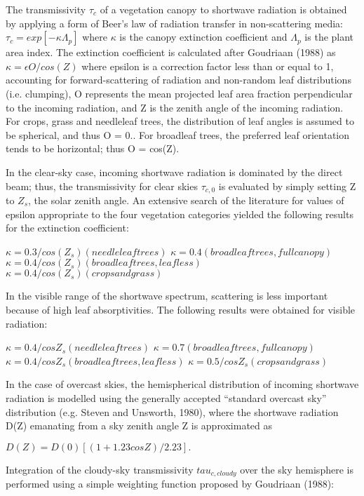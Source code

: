 The transmissivity $\tau_c$ of a vegetation canopy to shortwave radiation is obtained by applying a form of Beer’s law of radiation transfer in non-\/scattering media\+: $\tau_c = exp[-\kappa \Lambda_p]$ where $\kappa$ is the canopy extinction coefficient and $\Lambda_p$ is the plant area index. The extinction coefficient is calculated after Goudriaan (1988) as $\kappa = \epsilon O/cos(Z)$ where epsilon is a correction factor less than or equal to 1, accounting for forward-\/scattering of radiation and non-\/random leaf distributions (i.\+e. clumping), O represents the mean projected leaf area fraction perpendicular to the incoming radiation, and Z is the zenith angle of the incoming radiation. For crops, grass and needleleaf trees, the distribution of leaf angles is assumed to be spherical, and thus O = 0.. For broadleaf trees, the preferred leaf orientation tends to be horizontal; thus O = cos(\+Z).

In the clear-\/sky case, incoming shortwave radiation is dominated by the direct beam; thus, the transmissivity for clear skies $\tau_{c,0}$ is evaluated by simply setting Z to $Z_s$, the solar zenith angle. An extensive search of the literature for values of epsilon appropriate to the four vegetation categories yielded the following results for the extinction coefficient\+:

$\kappa = 0.3/cos(Z_s) (needleleaf trees)$ $\kappa = 0.4 (broadleaf trees, full canopy)$ $\kappa = 0.4/cos(Z_s) (broadleaf trees, leafless)$ $\kappa = 0.4/cos(Z_s) (crops and grass)$

In the visible range of the shortwave spectrum, scattering is less important because of high leaf absorptivities. The following results were obtained for visible radiation\+:

$\kappa = 0.4/cosZ_s (needleleaf trees)$ $\kappa = 0.7 (broadleaf trees, full canopy)$ $\kappa = 0.4/cosZ_s (broadleaf trees, leafless)$ $\kappa = 0.5/cosZ_s (crops and grass)$

In the case of overcast skies, the hemispherical distribution of incoming shortwave radiation is modelled using the generally accepted “standard overcast sky” distribution (e.\+g. Steven and Unsworth, 1980), where the shortwave radiation D(\+Z) emanating from a sky zenith angle Z is approximated as

$D(Z) = D(0) [(1 + 1.23cosZ)/2.23].$

Integration of the cloudy-\/sky transmissivity $tau_{c,cloudy}$ over the sky hemisphere is performed using a simple weighting function proposed by Goudriaan (1988)\+:

